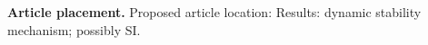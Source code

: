 \textbf{Article placement.} Proposed article location: Results: dynamic stability mechanism; possibly SI.
